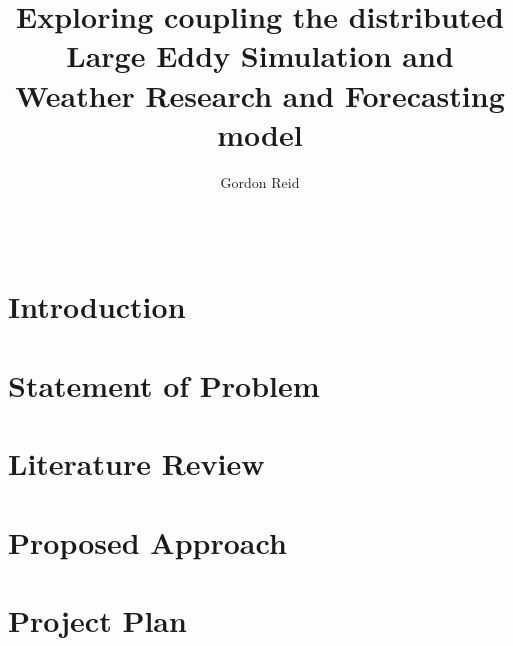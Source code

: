 \documentclass{acm_proc_article-sp}
\title{Exploring coupling the distributed Large Eddy Simulation and Weather
Research and Forecasting model}
\author{
    \alignauthor
    Gordon Reid\\
    \affaddr{School of Computing Science}\\
    \affaddr{University of Glasgow}\\
    \email{1002536r@student.gla.ac.uk}
}
\begin{document}
\maketitle

\begin{abstract}

\end{abstract}

\section{Introduction}


\section{Statement of Problem}
\label{sec:statementOfProblem}


\section{Literature Review}
\label{sec:literatureReview}


\section{Proposed Approach}
\label{sec:proposedApproach}


\section{Project Plan}
\label{sec:projectPlan}




\end{document}
